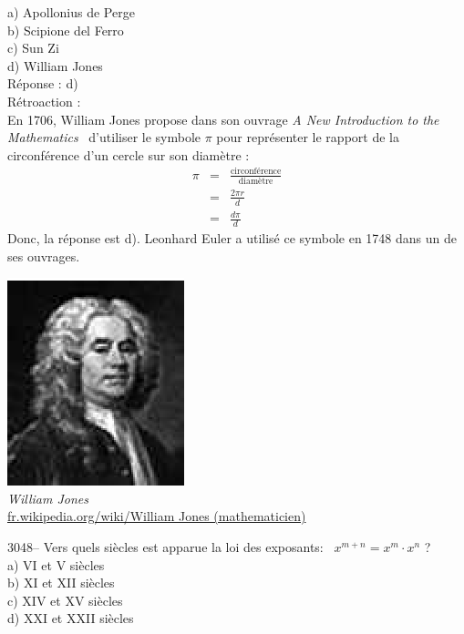 \documentclass[letterpaper, 12pt]{article}
\begin{document}
a) Apollonius de Perge\\
b) Scipione del Ferro\\
c) Sun Zi\\
d) William Jones\\

R\'eponse : d)\\

R\'etroaction :\\
En 1706, William Jones propose dans son ouvrage \og \emph{A New Introduction to the Mathematics} \fg \ d'utiliser le symbole $\pi$ pour repr\'esenter le rapport de la circonf\'erence d'un cercle sur son diam\`etre :
\begin{eqnarray*}
\pi &=& \frac{\textrm{circonf\'erence}}{\textrm{diam\`etre}}\\[2mm]
 &=& \frac{2\pi r}{d}\\[2mm]
 &=& \frac{d\pi}{d}
\end{eqnarray*}
Donc, la r\'eponse est d). Leonhard Euler a utilis\'e ce symbole en 1748 dans un de ses ouvrages.

\begin{center}
\includegraphics[scale=1]{William_Jones.eps}\\
\emph{{\small William Jones}}\\
\href{http://fr.wikipedia.org/wiki/William Jones \%28math\%C3\%A9maticien\%29}{fr.wikipedia.org/wiki/William Jones (mathematicien)}\\[5mm]
\end{center}



3048-- Vers quels si\`ecles est apparue la loi des exposants: \ $x^{m+n} = x^{m} \cdot x^{n}$ ?\\

a) {\scriptsize VI\ieme{}} et {\scriptsize V\ieme{}} si\`ecles\\
b) {\scriptsize XI\ieme{}} et {\scriptsize XII\ieme{}} si\`ecles\\
c) {\scriptsize XIV\ieme{}} et {\scriptsize XV\ieme{}} si\`ecles\\
d) {\scriptsize XXI\ieme{}} et {\scriptsize XXII\ieme{}} si\`ecles\\
\end{document}
